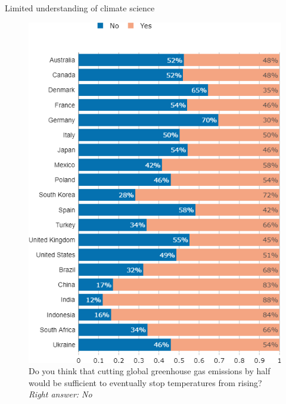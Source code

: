 \begin{frame}{Limited understanding of climate science}%
	\begin{figure}%
	\centering
	\caption{Do you think that cutting global greenhouse gas emissions by half would be sufficient to eventually stop temperatures from rising? \\
	\footnotesize{\textit{Right answer: No}}} \vspace{-.5cm}
	\includegraphics[height=.8\paperheight]{../figures/country_comparison/CC_dynamic_countries.png}
	
	\end{figure}
\end{frame}

